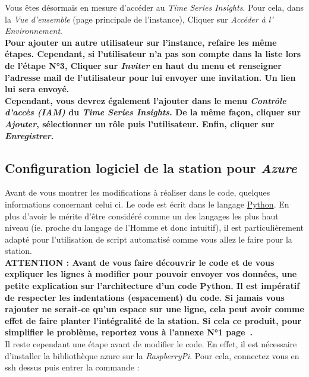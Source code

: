 Vous êtes désormais en mesure d'accéder au \textit{Time Series Insights}. Pour cela, dans la \textit{Vue d'ensemble} (page principale de l'instance), Cliquer sur \textit{Accéder à l' Environnement}.\\

\textbf{Pour ajouter un autre utilisateur sur l'instance, refaire les même étapes. Cependant, si l'utilisateur n'a pas son compte dans la liste lors de l'étape N°3, Cliquer sur \textit{Inviter} en haut du menu et renseigner l'adresse mail de l'utilisateur pour lui envoyer une invitation. Un lien lui sera envoyé.\\

Cependant, vous devrez également l'ajouter dans le menu \textit{Contrôle d'accès (IAM)} du \textit{Time Series Insights}. De la même façon, cliquer sur \textit{Ajouter}, sélectionner un rôle puis l'utilisateur. Enfin, cliquer sur \textit{Enregistrer}.}\\


\subsection{Configuration logiciel de la station pour \textit{Azure}}
\label{CONFIG}
Avant de vous montrer les modifications à réaliser dans le code, quelques informations concernant celui ci. Le code est écrit dans le langage \href{https://www.python.org/}{Python}. En plus d'avoir le mérite d'être considéré comme un des langages les plus haut niveau (ie. proche du langage de l'Homme et donc intuitif), il est particulièrement adapté pour l'utilisation de script automatisé comme vous allez le faire pour la station.\\

\textbf{ATTENTION : Avant de vous faire découvrir le code et de vous expliquer les lignes à modifier pour pouvoir envoyer vos données, une petite explication sur l'architecture d'un code Python. Il est impératif de respecter les indentations (espacement) du code. Si jamais vous rajouter ne serait-ce qu'un espace sur une ligne, cela peut avoir comme effet de faire planter l'intégralité de la station. Si cela ce produit, pour simplifier le problème, reportez vous à l'annexe N°1 page~\pageref{ANNEXE1}.}\\

Il reste cependant une étape avant de modifier le code. En effet, il est nécessaire d'installer la bibliothèque azure sur la \textit{RaspberryPi}. Pour cela, connectez vous en ssh dessus puis entrer la commande :\\

